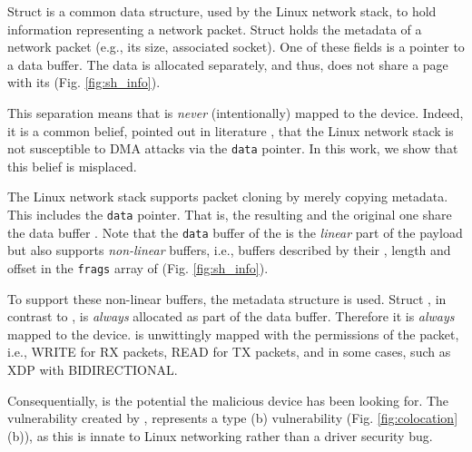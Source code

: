 Struct \skb{} is a common data structure, used by the Linux network stack, to hold information representing a network packet. Struct \skb{} holds the metadata of a network packet (e.g., its size, associated socket). One of these fields is a pointer to a data buffer. The data is allocated separately, and thus, does not share a page with its \skb{} (Fig. \ref{fig:sh_info}). 

This separation means that \skb{} is \emph{never} (intentionally) mapped to the device. Indeed, it is a common belief, pointed out in literature \cite{thunder}, that the Linux network stack is not susceptible to DMA attacks via the \texttt{data} pointer. In this work, we show that this belief is misplaced.

The Linux network stack supports packet cloning by merely copying \skb{} metadata. This includes the \texttt{data} pointer. That is, the resulting \skb{} and the original one share the data buffer \cite{drivers2005linux}. Note that the \texttt{data} buffer of the \skb{} is the \emph{linear} part of the payload but \skb{} also supports \emph{non-linear} buffers, i.e., buffers described by their \page{}, length and offset in the \texttt{frags} array of \shinfo{} (Fig. \ref{fig:sh_info}). 

To support these non-linear buffers, the \shinfo{} metadata structure is used.
Struct \shinfo{}, in contrast to \skb{}, is \emph{always} allocated as part of the data buffer. Therefore it is \emph{always} mapped to the device. \shinfo{} is unwittingly mapped with the permissions of the packet, i.e., WRITE for RX packets, READ for TX packets, and in some cases, such as XDP \cite{xdp} with BIDIRECTIONAL.

Consequentially, \shinfo{} is the potential \oportunity{} the malicious device has been looking for. The \subpage{} vulnerability created by \shinfo{}, represents a type (b) vulnerability (Fig. \ref{fig:colocation} (b)), as this is innate to Linux networking rather than a driver security bug. 

